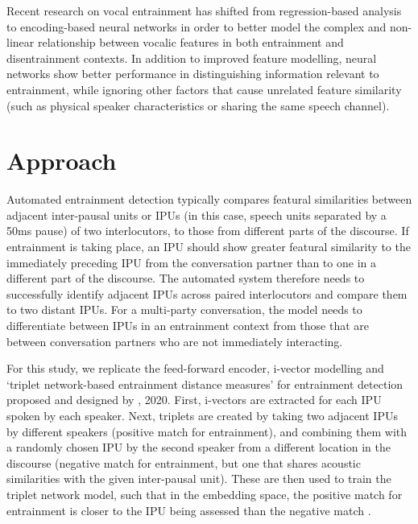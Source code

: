     Recent research on vocal entrainment has shifted from regression-based
    analysis to encoding-based neural networks in order to better model the
    complex and non-linear relationship between vocalic features in both
    entrainment and disentrainment contexts. In addition to improved feature
    modelling, neural networks show better performance in distinguishing
    information relevant to entrainment, while ignoring other factors that
    cause unrelated feature similarity (such as physical speaker
    characteristics or sharing the same speech channel)\parencite{nasir2020}.

\section{Approach}

    Automated entrainment detection typically compares featural similarities
    between adjacent inter-pausal units or IPUs (in this case, speech units
    separated by a 50ms pause) of two interlocutors, to those from different
    parts of the discourse. If entrainment is taking place, an IPU should show
    greater featural similarity to the immediately preceding IPU from the
    conversation partner than to one in a different part of the discourse. The
    automated system therefore needs to successfully identify adjacent IPUs
    across paired interlocutors and compare them to two distant IPUs. For a
    multi-party conversation, the model needs to differentiate between IPUs in
    an entrainment context from those that are between conversation partners
    who are not immediately interacting.

    For this study, we replicate the feed-forward encoder, i-vector modelling
    and `triplet network-based entrainment distance measures' for entrainment
    detection proposed and designed by \citeauthor{nasir2020}, 2020. First,
    i-vectors are extracted for each IPU spoken by each speaker. Next, triplets
    are created by taking two adjacent IPUs by different speakers (positive
    match for entrainment), and combining them with a randomly chosen IPU by
    the second speaker from a different location in the discourse (negative
    match for entrainment, but one that shares acoustic similarities with the
    given inter-pausal unit). These are then used to train the triplet network
    model, such that in the embedding space,
    the positive match for entrainment is closer to the IPU being assessed than
    the negative match \cite{hoffer2015deep}.

